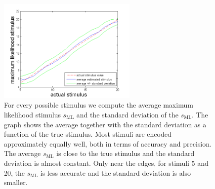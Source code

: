\documentclass{scrartcl}
\begin{document}
\begin{figure}
\centering
\includegraphics[trim = {0.6cm 0 1.2cm 0.6cm}, width=0.6\textwidth, clip]{../pics/decode}
\caption{For every possible stimulus we compute the average maximum likelihood stimulus $s_\mathrm{ML}$ and the standard deviation of the $s_\mathrm{ML}$. The graph shows the average together with the standard deviation as a function of the true stimulus. Most stimuli are encoded approximately equally well, both in terms of accuracy and precision. The average $s_\mathrm{ML}$ is close to the true stimulus and the standard deviation is almost constant. Only near the edges, for stimuli 5 and 20, the $s_\mathrm{ML}$ is less accurate and the standard deviation is also smaller.}
\label{decode}
\end{figure}
\end{document}
